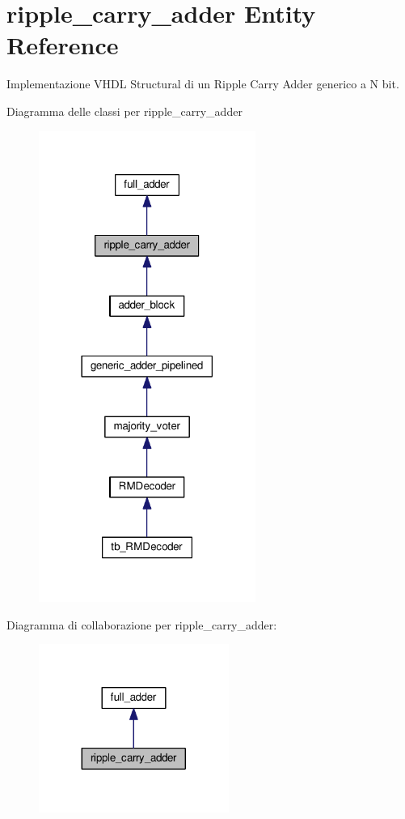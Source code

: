 \hypertarget{classripple__carry__adder}{\section{ripple\+\_\+carry\+\_\+adder Entity Reference}
\label{classripple__carry__adder}
}


Implementazione V\+H\+D\+L Structural di un Ripple Carry Adder generico a N bit.  




Diagramma delle classi per ripple\+\_\+carry\+\_\+adder\nopagebreak
\begin{figure}[H]
\begin{center}
\leavevmode
\includegraphics[width=201pt]{classripple__carry__adder__inherit__graph}
\end{center}
\end{figure}


Diagramma di collaborazione per ripple\+\_\+carry\+\_\+adder\+:\nopagebreak
\begin{figure}[H]
\begin{center}
\leavevmode
\includegraphics[width=176pt]{classripple__carry__adder__coll__graph}
\end{center}
\end{figure}
